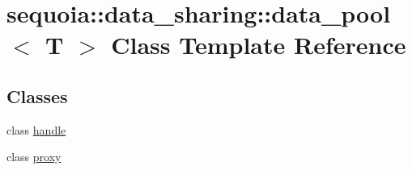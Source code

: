 \hypertarget{classsequoia_1_1data__sharing_1_1data__pool}{}\section{sequoia\+::data\+\_\+sharing\+::data\+\_\+pool$<$ T $>$ Class Template Reference}
\label{classsequoia_1_1data__sharing_1_1data__pool}
\subsection*{Classes}
\begin{DoxyCompactItemize}
\item 
class \mbox{\hyperlink{classsequoia_1_1data__sharing_1_1data__pool_1_1handle}{handle}}
\item 
class \mbox{\hyperlink{classsequoia_1_1data__sharing_1_1data__pool_1_1proxy}{proxy}}
\end{DoxyCompactItemize}
